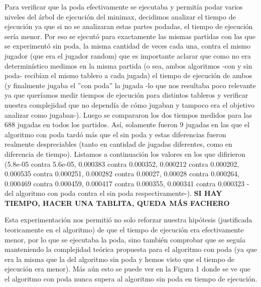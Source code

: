 \documentclass[A4paper,oneside,fleqn,11pt]{article}
\theoremstyle{definition}
\begin{document}
Para verificar que la poda efectivamente se ejecutaba y permitía podar varios niveles del árbol de ejecución del minimax, decidimos analizar el tiempo de ejecución ya que si no se analizaran estas partes podadas, el tiempo de ejecución sería menor. Por eso se ejecutó para exactamente las mismas partidas con las que se experimentó sin poda, la misma cantidad de veces cada una, contra el mismo jugador (que era el jugador random) que es importante aclarar que como no era determinístico medimos en la misma partida (o sea, ambos algoritmos -con y sin poda- recibían el mismo tablero a cada jugada) el tiempo de ejecución de ambos (y finalmente jugaba el ''con poda'' la jugada -lo que nos resultaba poco relevante ya que queríamos medir tiempos de ejecución para distintos tableros y verificar nuestra complejidad que no dependía de cómo jugaban y tampoco era el objetivo analizar como jugaban-). Luego se compararon los dos tiempos medidos para las 688 jugadas en todos los partidos. Así, solamente fueron 9 jugadas en las que el algoritmo con poda tardó más que el sin poda y estas diferencias fueron realmente despreciables (tanto en cantidad de jugadas diferentes, como en diferencia de tiempo). Listamos a continuación los valores en los que difirieron (5.8e-05 contra 5.6e-05, 0.000383 contra 0.000352, 0.000212 contra 0.000202, 0.000535 contra 0.000251, 0.000282 contra 0.00027, 0.00028 contra 0.000264, 0.000469 contra 0.000459, 0.000417 contra 0.000355, 0.000341 contra 0.000323 -del algoritmo con poda contra el sin poda respectivamente-).
\textbf{SI HAY TIEMPO, HACER UNA TABLITA, QUEDA MÁS FACHERO}

Esta experimentación nos permitió no solo reforzar nuestra hipótesis (justificada teoricamente en el algoritmo) de que el tiempo de ejecución era efectivamente menor, por lo que se ejecutaba la poda, sino también comprobar que se seguía manteniendo la complejidad teórica propuesta para el algoritmo con poda (ya que era la misma que la del algoritmo sin poda y hemos visto que el tiempo de ejecución era menor). Más aún esto se puede ver en la Figura 1 donde se ve que el algoritmo con poda nunca supera al algoritmo sin poda en tiempo de ejecución.
\end{document}
